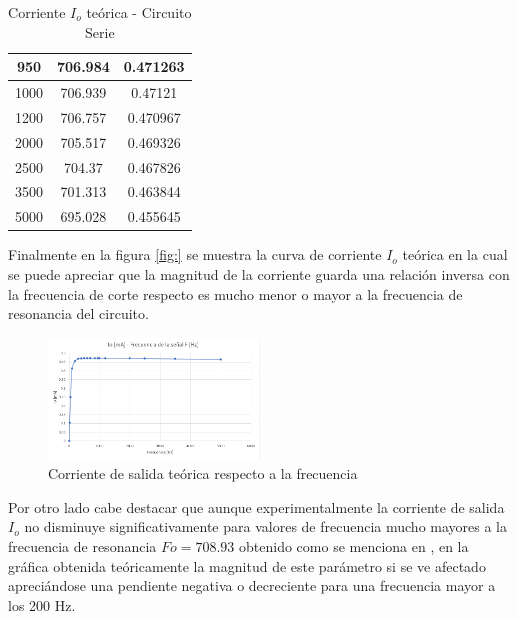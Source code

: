 \documentclass[conference]{IEEEtran}
\begin{document}
\begin{table}[]
\begin{tabular}{|ccc|}
			\multicolumn{1}{|c|}{950}             & \multicolumn{1}{c|}{706.984}              & 0.471263             \\ \hline
			\multicolumn{1}{|c|}{1000}            & \multicolumn{1}{c|}{706.939}              & 0.47121              \\ \hline
			\multicolumn{1}{|c|}{1200}            & \multicolumn{1}{c|}{706.757}              & 0.470967             \\ \hline
			\multicolumn{1}{|c|}{2000}            & \multicolumn{1}{c|}{705.517}              & 0.469326             \\ \hline
			\multicolumn{1}{|c|}{2500}            & \multicolumn{1}{c|}{704.37}               & 0.467826             \\ \hline
			\multicolumn{1}{|c|}{3500}            & \multicolumn{1}{c|}{701.313}              & 0.463844             \\ \hline
			\multicolumn{1}{|c|}{5000}            & \multicolumn{1}{c|}{695.028}              & 0.455645             \\ \hline
		\end{tabular}
		\caption{Corriente $I_o$ teórica - Circuito Serie}
		\label{tab:valores-teoricos-serie}
	\end{table}
	
	Finalmente en la figura \ref{fig:} se muestra la curva de corriente $I_o$ teórica en la cual se puede apreciar que la magnitud de la corriente guarda una relación inversa con la frecuencia de corte respecto es mucho menor o mayor a la frecuencia de resonancia del circuito.
 	
 	\begin{figure}[h]
 		\centering
 		\includegraphics[width=0.5\textwidth]{media/grafica-corriente-teorica-serie}
 		\caption{Corriente de salida teórica respecto a la frecuencia}
 		\label{fig:grafica-corriente-teorica-serie}
 	\end{figure}
 	
 	Por otro lado cabe destacar que aunque experimentalmente la corriente de salida $I_o$ no disminuye significativamente para valores de frecuencia mucho mayores a la frecuencia de resonancia $Fo = 708.93$ obtenido como se menciona en \cite{krauss_estado_solido}, en la gráfica obtenida teóricamente la magnitud de este parámetro si se ve afectado apreciándose una pendiente negativa o decreciente para una frecuencia mayor a los 200 Hz.
 	
\end{document}

